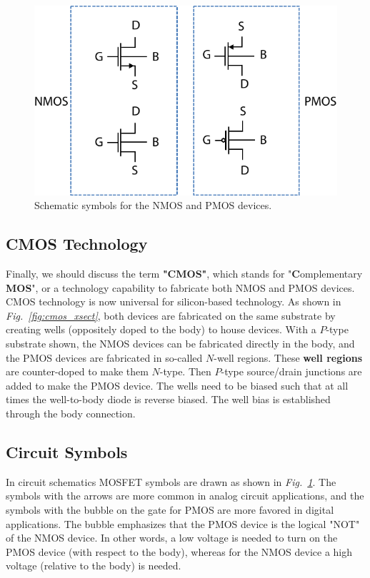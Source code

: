 \begin{figure}[H]
\centering
\includegraphics[width=.6\columnwidth]{mos_symbols}
\caption{Schematic symbols for the NMOS and PMOS devices.}
\label{fig:mos_symbols}
\end{figure}
\subsection{CMOS Technology}
Finally, we should discuss the term \textbf{"CMOS"}, which stands for "\textbf{C}omplementary \textbf{MOS}", or a technology capability to fabricate both NMOS and PMOS devices.  CMOS technology is now universal for silicon-based technology.  As shown in \emph{Fig.~\ref{fig:cmos_xsect}}, both devices are fabricated on the same substrate by creating wells (oppositely doped to the body) to house devices.  With a $P$-type substrate shown, the NMOS devices can be fabricated directly in the body, and the PMOS devices are fabricated in so-called $N$-well regions.  These \textbf{well regions} are counter-doped to make them $N$-type.  Then $P$-type source/drain junctions are added to make the PMOS device.  The wells need to be biased such that at all times the well-to-body diode is reverse biased.  The well bias is established through the body connection.
\subsection{Circuit Symbols}
In circuit schematics MOSFET symbols are drawn as shown in \emph{Fig.~\ref{fig:mos_symbols}}.  The symbols with the arrows are more common in analog circuit applications, and the symbols with the bubble on the gate for PMOS are more favored in digital applications.  The bubble emphasizes that the PMOS device is the logical "NOT" of the NMOS device. In other words, a low voltage is needed to turn on the PMOS device (with respect to the body), whereas for the NMOS device a high voltage (relative to the body) is needed.

